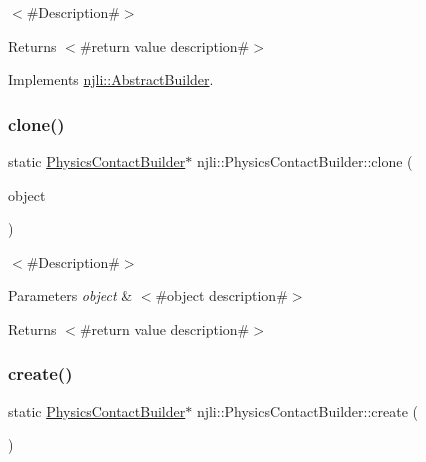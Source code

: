 $<$\#\+Description\#$>$

\begin{DoxyReturn}{Returns}
$<$\#return value description\#$>$ 
\end{DoxyReturn}


Implements \mbox{\hyperlink{classnjli_1_1_abstract_builder_aa1d220053e182c37b31b427499c6eacf}{njli\+::\+Abstract\+Builder}}.

\mbox{\label{classnjli_1_1_physics_contact_builder_a3c138121444b8c66a9c6f5481c4e1ea4}} 
\subsubsection{\texorpdfstring{clone()}{clone()}}
{\footnotesize\ttfamily static \mbox{\hyperlink{classnjli_1_1_physics_contact_builder}{Physics\+Contact\+Builder}}$\ast$ njli\+::\+Physics\+Contact\+Builder\+::clone (\begin{DoxyParamCaption}\item[{const \mbox{\hyperlink{classnjli_1_1_physics_contact_builder}{Physics\+Contact\+Builder}} \&}]{object }\end{DoxyParamCaption})\hspace{0.3cm}{\ttfamily [static]}}

$<$\#\+Description\#$>$


\begin{DoxyParams}{Parameters}
{\em object} & $<$\#object description\#$>$\\
\hline
\end{DoxyParams}
\begin{DoxyReturn}{Returns}
$<$\#return value description\#$>$ 
\end{DoxyReturn}
\mbox{\label{classnjli_1_1_physics_contact_builder_a3d38cec8ab92913ff95d1d4311d30cff}} 
\subsubsection{\texorpdfstring{create()}{create()}}
{\footnotesize\ttfamily static \mbox{\hyperlink{classnjli_1_1_physics_contact_builder}{Physics\+Contact\+Builder}}$\ast$ njli\+::\+Physics\+Contact\+Builder\+::create (\begin{DoxyParamCaption}{ }\end{DoxyParamCaption})\hspace{0.3cm}{\ttfamily [static]}}

